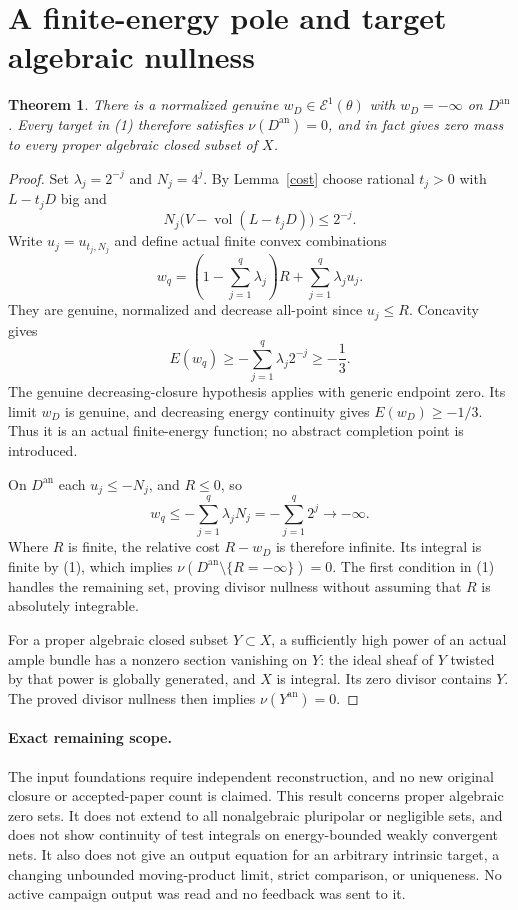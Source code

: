 \documentclass[11pt]{article}
\newtheorem{theorem}{Theorem}
\newcommand{\Eone}{\mathcal E^1}
\newcommand{\vol}{\operatorname{vol}}
\begin{document}
\section{A finite-energy pole and target algebraic nullness}
\begin{theorem}\label{null}
There is a normalized genuine $w_D\in\Eone(\theta)$ with
$w_D=-\infty$ on $D^{\mathrm{an}}$. Every target in (1) therefore
satisfies $\nu(D^{\mathrm{an}})=0$, and in fact gives zero mass to
every proper algebraic closed subset of $X$.
\end{theorem}
\begin{proof}
Set $\lambda_j=2^{-j}$ and $N_j=4^j$. By Lemma~\ref{cost} choose
rational $t_j>0$ with $L-t_jD$ big and
\[
 N_j\bigl(V-\vol(L-t_jD)\bigr)\leq2^{-j}.
\]
Write $u_j=u_{t_j,N_j}$ and define actual finite convex combinations
\[
 w_q=\left(1-\sum_{j=1}^q\lambda_j\right)R
                                  +\sum_{j=1}^q\lambda_j u_j.
                                                        \tag{5}
\]
They are genuine, normalized and decrease all-point since $u_j\leq R$.
Concavity gives
\[
 E(w_q)\geq-\sum_{j=1}^q\lambda_j2^{-j}\geq-\frac13.
\]
The genuine decreasing-closure hypothesis applies with generic endpoint
zero. Its limit $w_D$ is genuine, and decreasing energy continuity
gives $E(w_D)\geq-1/3$. Thus it is an actual finite-energy function;
no abstract completion point is introduced.

On $D^{\mathrm{an}}$ each $u_j\leq-N_j$, and $R\leq0$, so
\[
        w_q\leq-\sum_{j=1}^q\lambda_jN_j
                     =-\sum_{j=1}^q2^j\longrightarrow-\infty.
\]
Where $R$ is finite, the relative cost $R-w_D$ is therefore infinite.
Its integral is finite by (1), which implies
$\nu(D^{\mathrm{an}}\setminus\{R=-\infty\})=0$. The first condition
in (1) handles the remaining set, proving divisor nullness without
assuming that $R$ is absolutely integrable.

For a proper algebraic closed subset $Y\subset X$, a sufficiently high
power of an actual ample bundle has a nonzero section vanishing on $Y$:
the ideal sheaf of $Y$ twisted by that power is globally generated,
and $X$ is integral. Its zero divisor contains $Y$. The proved divisor
nullness then implies $\nu(Y^{\mathrm{an}})=0$.
\end{proof}

\paragraph{Exact remaining scope.}
The input foundations require independent reconstruction, and no new
original closure or accepted-paper count is claimed. This result concerns
proper algebraic zero sets. It does not extend to all nonalgebraic
pluripolar or negligible sets, and does not show continuity of test
integrals on energy-bounded weakly convergent nets. It also does not
give an output equation for an arbitrary intrinsic target, a changing
unbounded moving-product limit, strict comparison, or uniqueness.
No active campaign output was read and no feedback was sent to it.
\end{document}
